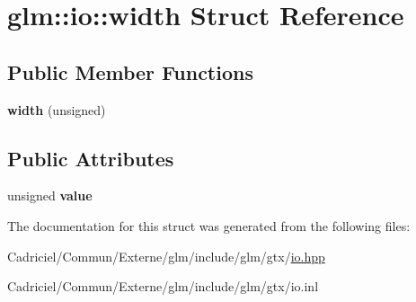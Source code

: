 \hypertarget{structglm_1_1io_1_1width}{}\section{glm\+:\+:io\+:\+:width Struct Reference}
\label{structglm_1_1io_1_1width}
\subsection*{Public Member Functions}
\begin{DoxyCompactItemize}
\item 
{\bfseries width} (unsigned)\hypertarget{structglm_1_1io_1_1width_a1576674b7e08dc5014ce4f41ac6eea5b}{}\label{structglm_1_1io_1_1width_a1576674b7e08dc5014ce4f41ac6eea5b}

\end{DoxyCompactItemize}
\subsection*{Public Attributes}
\begin{DoxyCompactItemize}
\item 
unsigned {\bfseries value}\hypertarget{structglm_1_1io_1_1width_a6bf1338eb947811d36ec93bd2e9b8425}{}\label{structglm_1_1io_1_1width_a6bf1338eb947811d36ec93bd2e9b8425}

\end{DoxyCompactItemize}


The documentation for this struct was generated from the following files\+:\begin{DoxyCompactItemize}
\item 
Cadriciel/\+Commun/\+Externe/glm/include/glm/gtx/\hyperlink{io_8hpp}{io.\+hpp}\item 
Cadriciel/\+Commun/\+Externe/glm/include/glm/gtx/io.\+inl\end{DoxyCompactItemize}
